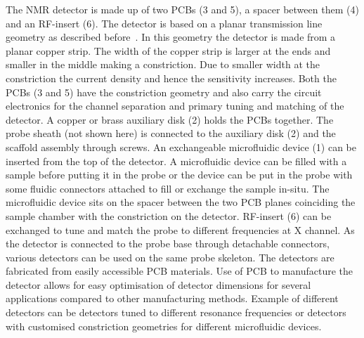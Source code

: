 \documentclass[preprint,12pt]{article}
\begin{document}
The NMR detector is made up of two PCBs (3 and 5), a spacer between them (4) and an RF-insert (6). The detector is based on a planar transmission line geometry as described before~\cite{gream_2016,stripline_jan}. In this geometry the detector is made from a planar copper strip. The width of the copper strip is larger at the ends and smaller in the middle making a constriction. Due to smaller width at the constriction the current density and hence the sensitivity increases. Both the PCBs (3 and 5) have the constriction geometry  and also carry the circuit electronics for the channel separation and primary tuning and matching of the detector. A copper or brass auxiliary disk (2) holds the PCBs together. The probe sheath (not shown here) is connected to the auxiliary disk (2) and the scaffold assembly through screws. An exchangeable microfluidic device (1) can be inserted from the top of the detector. A microfluidic device can be filled with a sample before putting it in the probe or the device can be put in the probe with some fluidic connectors attached to fill or exchange the sample in-situ. The microfluidic device sits on the spacer between the two PCB planes coinciding the sample chamber with the constriction on the detector.  RF-insert (6) can be exchanged to tune and match the probe to different frequencies at X channel. As the detector is connected to the probe base through detachable connectors, various detectors can be used on the same probe skeleton. The detectors are fabricated from easily accessible PCB materials. Use of PCB to manufacture the detector allows for easy optimisation of detector dimensions for several applications compared to other manufacturing methods. Example of different detectors can be detectors tuned to different resonance frequencies or detectors with customised constriction geometries for different microfluidic devices.\par
\end{document}
